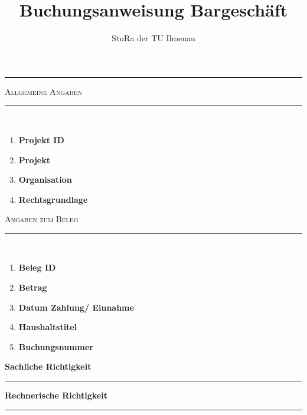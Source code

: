 \documentclass[a4paper,11pt]{article}
\makeatletter
\newcommand{\linia}{\rule{\linewidth}{0.5pt}}
\newcommand{\mysection}[1]{
	\begin{center}
	{\large \textsc{#1}}
	\vspace*{-0.5cm}
	\\\linia\\
	\vspace*{-0.5cm}
	\end{center}
}
\theoremstyle{mytheor}
\renewcommand{\maketitle}{
	\begin{center}
	\vspace*{-0.5cm}
	{\huge \textsc{\@title}}
	\linia
	\end{center}
}
\makeatother
\begin{document}
\title{Buchungsanweisung Bargeschäft}
\author{StuRa der TU Ilmenau}

\vspace*{-2.0cm}
\begin{figure}[h]
\centering
\end{figure}

\maketitle

\vspace*{-0.5cm}

\mysection{Allgemeine Angaben}

\begin{enumerate}[label=\Roman*]
\itemsep-2mm
\item \textbf{Projekt ID}\hfill 
\item \textbf{Projekt}\hfill 
\item \textbf{Organisation} \hfill 
\item \textbf{Rechtsgrundlage} \hfill  
\end{enumerate}

\vspace*{2mm}
\mysection{Angaben zum Beleg}
\begin{enumerate}[label=\Roman*,resume]
\itemsep-2mm
\item \textbf{Beleg ID} \hfill
\item \textbf{Betrag} \hfill
\item \textbf{Datum Zahlung/ Einnahme} \hfill 
\item \textbf{Haushaltstitel} \hfill 
\vspace{0,5cm}
\item \textbf{Buchungsnummer} \hfill %
\end{enumerate}

\vspace{0,5cm}
\parbox[b]{0.4\linewidth}{%
	\strut 
	\textbf{Sachliche Richtigkeit} \\[1.25cm]%
	\hrule
	\vspace{0.25cm}
} 
\hspace{0,5cm} %
\parbox[b]{0.4\linewidth}{%
	\strut 
	\textbf{Rechnerische Richtigkeit} \\[1.25cm]%
	\hrule 
	\vspace{0.25cm}
}


\end{document}
